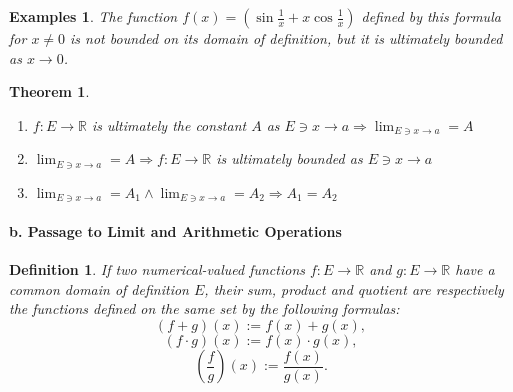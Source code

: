 \documentclass[a4paper,12pt]{article} %
\newtheorem{definition}{Definition}[section]
\newtheorem{theorem}{Theorem}[section]
\newtheorem{example}{Examples}
\begin{document}
\begin{example}
    The function $\displaystyle f(x) = \left(\sin \frac{1}{x} + x \cos \frac{1}{x}\right)$
    defined by this formula for $x \ne 0$ is not bounded on its domain of 
    definition, but it is ultimately bounded as $x \to 0$.
\end{example}

\begin{theorem}
    \begin{enumerate}
        \item $f: E \to \mathbb{R}$ is ultimately the constant $A$ as 
            $ \displaystyle E \ni 
            x \to a \Rightarrow \lim_{E \ni x \to a} = A$
        \item $ \displaystyle \lim_{E \ni x \to a} = A \Rightarrow 
            f: E \to \mathbb{R}$ is ultimately bounded as $E \ni x \to a$
        \item $ \displaystyle \lim_{E \ni x \to a} = A_1 \wedge  
            \lim_{E \ni x \to a} = A_2 \Rightarrow A_1 = A_2 $
    \end{enumerate}
\end{theorem}

\paragraph{{\rm \textbf{b. Passage to Limit and Arithmetic Operations}}}
\begin{definition}
    If two numerical-valued functions $f: E \to \mathbb{R}$ and $g: E \to \mathbb{R}$ 
    have a common domain of definition $E$, their sum, product and quotient 
    are respectively the functions defined on the same set by the 
    following formulas:
    \[
        \left(f+g\right)(x) := f(x) + g(x),
        \]
    \[
        \left(f\cdot g\right)(x) := f(x)\cdot g(x),
        \]
    \[
        \left(\frac{f}{g}\right)(x) := \frac{f(x)}{g(x)}.
        \]
\end{definition}
\end{document}
